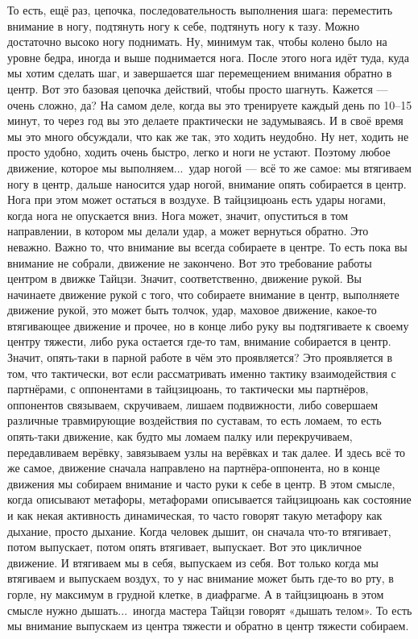 То есть, ещё раз, цепочка, последовательность выполнения шага: переместить внимание в ногу,
подтянуть ногу к себе, подтянуть ногу к тазу. Можно достаточно высоко ногу поднимать. Ну,
минимум так, чтобы колено было на уровне бедра, иногда и выше поднимается нога.
После этого нога идёт туда, куда мы хотим сделать шаг, и завершается шаг перемещением внимания
обратно в центр. Вот это базовая цепочка действий, чтобы просто шагнуть. Кажется --- очень сложно,
да? На самом деле, когда вы это тренируете каждый день по 10--15 минут, то через год вы это
делаете практически не задумываясь. И в своё время мы это много обсуждали, что как же так, это
ходить неудобно. Ну нет, ходить не просто удобно, ходить очень быстро, легко и ноги не
устают. Поэтому любое движение, которое мы выполняем...\ удар ногой --- всё то же самое: мы
втягиваем ногу в центр, дальше наносится удар ногой, внимание опять собирается в центр. Нога
при этом может остаться в воздухе. В тайцзицюань есть удары ногами, когда нога не опускается
вниз. Нога может, значит, опуститься в том направлении, в котором мы делали удар, а может
вернуться обратно. Это неважно. Важно то, что внимание вы всегда собираете в центре. То есть
пока вы внимание не собрали, движение не закончено. Вот это требование работы центром в движке
Тайцзи. Значит, соответственно, движение рукой. Вы начинаете движение рукой с того, что
собираете внимание в центр, выполняете движение рукой, это может быть толчок, удар, маховое
движение, какое-то втягивающее движение и прочее, но в конце либо руку вы подтягиваете к своему
центру тяжести, либо рука остается где-то там, внимание собирается в центр. Значит, опять-таки
в парной работе в чём это проявляется? Это проявляется в том, что тактически, вот если
рассматривать именно тактику взаимодействия с партнёрами, с оппонентами в тайцзицюань, то
тактически мы партнёров, оппонентов связываем, скручиваем, лишаем подвижности, либо
совершаем различные травмирующие
воздействия по суставам, то есть ломаем, то есть опять-таки движение, как будто мы ломаем палку или
перекручиваем, передавливаем верёвку, завязываем узлы на верёвках и так далее. И здесь всё то
же самое, движение сначала направлено на партнёра-оппонента, но в конце движения мы собираем
внимание и часто руки к себе в центр. В этом смысле, когда описывают метафоры,
метафорами описывается тайцзицюань как состояние и как некая активность динамическая, то часто
говорят такую метафору как дыхание, просто дыхание. Когда человек дышит, он сначала что-то
втягивает, потом выпускает, потом опять втягивает, выпускает. Вот это цикличное движение. И
втягиваем мы в себя, выпускаем из себя. Вот только когда мы втягиваем и выпускаем воздух, то у
нас внимание может быть где-то во рту, в горле, ну максимум в грудной клетке,
в диафрагме. А в
тайцзицюань в этом смысле нужно дышать...\ иногда мастера Тайцзи говорят «дышать телом».
То есть мы
внимание выпускаем из центра тяжести и обратно в центр тяжести собираем.

